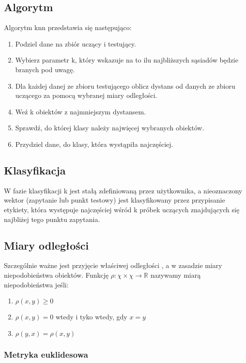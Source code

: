 \documentclass[runningheads]{llncs}
\begin{document}
\subsection{Algorytm}

Algorytm knn przedstawia się następująco:
\begin{enumerate}
    \item Podziel dane na zbiór uczący i testujący.
    \item Wybierz parametr k, który wskazuje na to ilu najbliższych sąsiadów będzie branych pod uwagę.
    \item Dla każdej danej ze zbioru testującego oblicz dystans od danych ze zbioru uczącego za pomocą wybranej miary odległości.
    \item Weź k obiektów z najmniejszym dystansem.
    \item Sprawdź, do której klasy należy najwięcej wybranych obiektów.
    \item Przydziel dane, do klasy, która wystąpiła najczęściej.
\end{enumerate}    
    
\subsection{Klasyfikacja}

    W fazie klasyfikacji k jest stałą zdefiniowaną przez użytkownika, a nieoznaczony wektor (zapytanie lub punkt testowy) jest klasyfikowany przez przypisanie etykiety, która występuje najczęściej wśród k próbek uczących znajdujących się najbliżej tego punktu zapytania. 

\subsection{Miary odległości}

Szczególnie ważne jest przyjęcie właściwej odległości \cite{distance}, a w zasadzie miary niepodobieństwa obiektów. Funkcję $ \rho:\chi\times \chi \rightarrow  \mathbb{R} $  nazywamy miarą niepodobieństwa jeśli:

    \begin{enumerate}
        \item $ \rho (x,y) \geq 0$  
        \item $ \rho (x,y) = 0 $ wtedy i tyko wtedy, gdy $ x = y$
        \item $ \rho (y,x) = \rho (x,y) $
    \end{enumerate}

\subsubsection{Metryka euklidesowa} 
\end{document}
